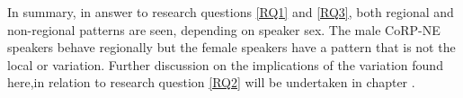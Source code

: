 \documentclass[../../../00.FullDoc/tex/APRReport-year4]{subfiles}
\begin{document}
In summary, in answer to research questions \ref{RQ1} and \ref{RQ3}, both regional and non-regional patterns are seen, depending on speaker sex. The male CoRP-NE speakers behave regionally but the female speakers have a pattern that is not the local or  variation. Further discussion on the implications of the variation found here,in relation to research question \ref{RQ2} will be undertaken in chapter \notinsubfile{\ref{ch:Discussion}}.



\ifSubfilesClassLoaded{%
}{}
	
%	
%		
			
\end{document}
